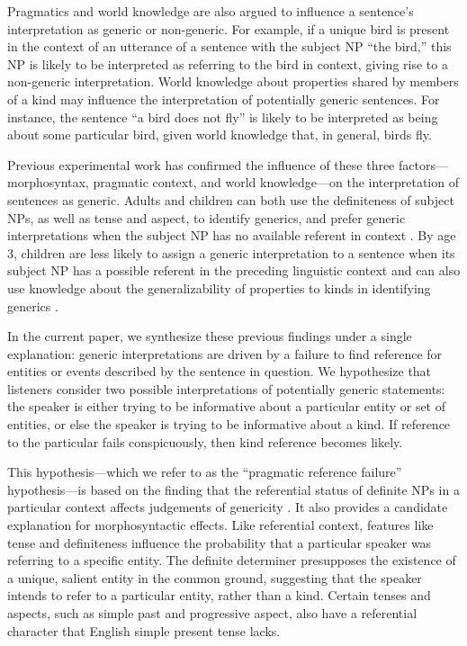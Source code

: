 \documentclass[10pt,letterpaper]{article}
\begin{document}
Pragmatics and world knowledge are also argued to influence a sentence's interpretation as generic or non-generic. For example, if a unique bird is present in the context of an utterance of a sentence with the subject NP ``the bird,'' this NP is likely to be interpreted as referring to the bird in context, giving rise to a non-generic interpretation. World knowledge about properties shared by members of a kind may influence the interpretation of potentially generic sentences. For instance, the sentence ``a bird does not fly'' is likely to be interpreted as being about some particular bird, given world knowledge that, in general, birds fly.

Previous experimental work has confirmed the influence of these three factors---morphosyntax, pragmatic context, and world knowledge---on the interpretation of sentences as generic. Adults and children can both use the definiteness of subject NPs, as well as tense and aspect, to identify generics, and prefer generic interpretations when the subject NP has no available referent in context \cite{Gelman:2003,Cimpian:2011}. By age 3, children are less likely to assign a generic interpretation to a sentence when its subject NP has a possible referent in the preceding linguistic context and can also use knowledge about the generalizability of properties to kinds in identifying generics \cite{Cimpian:2008}. 

In the current paper, we synthesize these previous findings under a single explanation: generic interpretations are driven by a failure to find reference for entities or events described by the sentence in question. We hypothesize that listeners consider two possible interpretations of potentially generic statements: the speaker is either trying to be informative about a particular entity or set of entities, or else the speaker is trying to be informative about a kind. If reference to the particular fails conspicuously, then kind reference becomes likely.


This hypothesis---which we refer to as the ``pragmatic reference failure'' hypothesis---is based on the finding that the referential status of definite NPs in a particular context affects judgements of genericity \cite{Gelman:2003}. It also provides a candidate explanation for morphosyntactic effects. Like referential context, features like tense and definiteness influence the probability that a particular speaker was referring to a specific entity. The definite determiner presupposes the existence of a unique, salient entity in the common ground, suggesting that the speaker intends to refer to a particular entity, rather than a kind. Certain tenses and aspects, such as simple past and progressive aspect, also have a referential character that English simple present tense lacks. 
\end{document}

